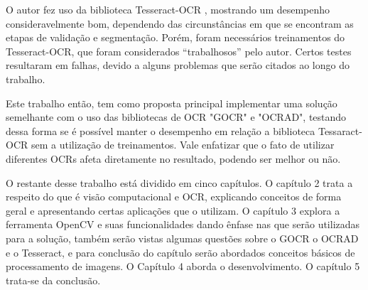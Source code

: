 O autor fez uso da biblioteca Tesseract-OCR \cite{tesseract-ocr}, mostrando um desempenho consideravelmente bom, dependendo das circunstâncias em que se encontram as etapas de validação e segmentação. Porém, foram necessários treinamentos do Tesseract-OCR, que foram considerados ``trabalhosos'' pelo autor. Certos testes resultaram em falhas, devido a alguns problemas que serão citados ao longo do trabalho. 

Este trabalho então, tem como proposta principal implementar uma solução semelhante com o uso das bibliotecas de OCR "GOCR" e "OCRAD", testando dessa forma se é possível manter o desempenho em relação a biblioteca Tessaract-OCR sem a utilização de treinamentos. Vale enfatizar que o fato de utilizar diferentes OCRs afeta diretamente no resultado, podendo ser melhor ou não.

O restante desse trabalho está dividido em cinco capítulos. O capítulo 2 trata a respeito do que é visão computacional e OCR, explicando conceitos de forma geral e apresentando certas aplicações que o utilizam. O capítulo 3 explora a ferramenta OpenCV e suas funcionalidades dando ênfase nas que serão utilizadas para a solução, também serão vistas algumas questões sobre o GOCR o OCRAD e o Tesseract, e para conclusão do capítulo serão abordados conceitos básicos de processamento de imagens. O Capítulo 4 aborda o desenvolvimento. O capítulo 5 trata-se da conclusão.
